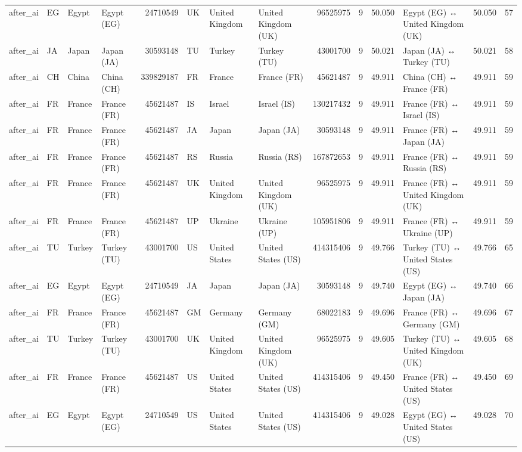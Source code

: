 \begin{tabular}{llllrlllrrrlrr}
after\_ai & EG & Egypt & Egypt (EG) & 24710549 & UK & United Kingdom & United Kingdom (UK) & 96525975 & 9 & 50.050 & Egypt (EG) ↔ United Kingdom (UK) & 50.050 & 57 \\
after\_ai & JA & Japan & Japan (JA) & 30593148 & TU & Turkey & Turkey (TU) & 43001700 & 9 & 50.021 & Japan (JA) ↔ Turkey (TU) & 50.021 & 58 \\
after\_ai & CH & China & China (CH) & 339829187 & FR & France & France (FR) & 45621487 & 9 & 49.911 & China (CH) ↔ France (FR) & 49.911 & 59 \\
after\_ai & FR & France & France (FR) & 45621487 & IS & Israel & Israel (IS) & 130217432 & 9 & 49.911 & France (FR) ↔ Israel (IS) & 49.911 & 59 \\
after\_ai & FR & France & France (FR) & 45621487 & JA & Japan & Japan (JA) & 30593148 & 9 & 49.911 & France (FR) ↔ Japan (JA) & 49.911 & 59 \\
after\_ai & FR & France & France (FR) & 45621487 & RS & Russia & Russia (RS) & 167872653 & 9 & 49.911 & France (FR) ↔ Russia (RS) & 49.911 & 59 \\
after\_ai & FR & France & France (FR) & 45621487 & UK & United Kingdom & United Kingdom (UK) & 96525975 & 9 & 49.911 & France (FR) ↔ United Kingdom (UK) & 49.911 & 59 \\
after\_ai & FR & France & France (FR) & 45621487 & UP & Ukraine & Ukraine (UP) & 105951806 & 9 & 49.911 & France (FR) ↔ Ukraine (UP) & 49.911 & 59 \\
after\_ai & TU & Turkey & Turkey (TU) & 43001700 & US & United States & United States (US) & 414315406 & 9 & 49.766 & Turkey (TU) ↔ United States (US) & 49.766 & 65 \\
after\_ai & EG & Egypt & Egypt (EG) & 24710549 & JA & Japan & Japan (JA) & 30593148 & 9 & 49.740 & Egypt (EG) ↔ Japan (JA) & 49.740 & 66 \\
after\_ai & FR & France & France (FR) & 45621487 & GM & Germany & Germany (GM) & 68022183 & 9 & 49.696 & France (FR) ↔ Germany (GM) & 49.696 & 67 \\
after\_ai & TU & Turkey & Turkey (TU) & 43001700 & UK & United Kingdom & United Kingdom (UK) & 96525975 & 9 & 49.605 & Turkey (TU) ↔ United Kingdom (UK) & 49.605 & 68 \\
after\_ai & FR & France & France (FR) & 45621487 & US & United States & United States (US) & 414315406 & 9 & 49.450 & France (FR) ↔ United States (US) & 49.450 & 69 \\
after\_ai & EG & Egypt & Egypt (EG) & 24710549 & US & United States & United States (US) & 414315406 & 9 & 49.028 & Egypt (EG) ↔ United States (US) & 49.028 & 70 \\

\end{tabular}
